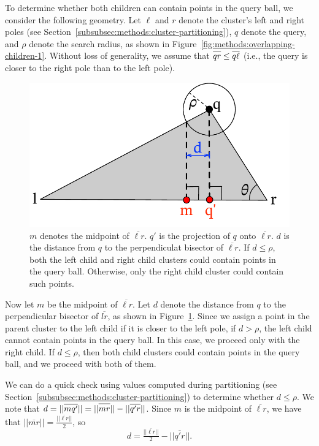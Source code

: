 To determine whether both children can contain points in the query ball, we consider the following geometry. 
Let $\ell$ and $r$ denote the cluster's left and right poles (see Section~\ref{subsubsec:methods:cluster-partitioning}), $q$ denote the query, and $\rho$ denote the search radius, as shown in Figure~\ref{fig:methods:overlapping-children-1}.
Without loss of generality, we assume that $\overline{qr \vphantom \ell} \leq \overline{q\ell}$ (i.e., the query is closer to the right pole than to the left pole). 


\begin{figure}[ht!]
    \centering
    \includegraphics[scale=0.5]{images/geometry/overlapping-children-3.pdf}
    \caption{
        $m$ denotes the midpoint of $\overline{\ell r}$. $q'$ is the projection of $q$ onto $\overline{\ell r}$. $d$ is the distance from $q$ to the perpendiculat bisector of $\overline{\ell r}$. If $d \leq \rho$, both the left child and right child clusters could contain points in the query ball. Otherwise, only the right child cluster could contain such points. 
    }
    \label{fig:methods:overlapping-children-3}
\end{figure}

Now let $m$ be the midpoint of $\overline{\ell r}$. Let $d$ denote the distance from $q$ to the perpendicular bisector of $\overline{lr}$, as shown in Figure~\ref{fig:methods:overlapping-children-3}. Since we assign a point in the parent cluster to the left child if it is closer to the left pole, if $d > \rho$, 
the left child cannot contain points in the query ball. In this case, we proceed only with the right child. If $d \leq \rho$, 
then both child clusters could contain points in the query ball, and we proceed with both of them. 

We can do a quick check using values computed during partitioning (see Section~\ref{subsubsec:methods:cluster-partitioning}) to determine whether $d \leq \rho$. 
We note that $d = ||\overline{mq'}|| = ||\overline{mr \vphantom {q'}}||-||\overline{q'r}||$. Since $m$ is the midpoint of $\overline{\ell r}$, we have that $||\overline{mr}|| = \tfrac{||\overline{\ell r}||}{2}$, so \begin{equation} d = \tfrac{||\overline{\ell r}||}{2} - ||\overline{q'r}||.
\label{eq:methods:d-expression}
\end{equation}



